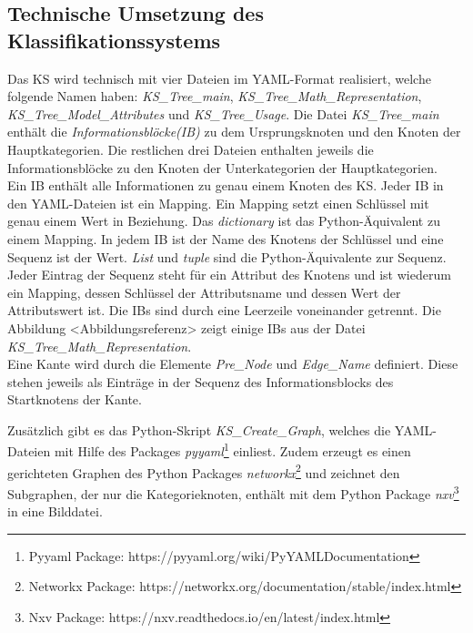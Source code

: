 \subsection{Technische Umsetzung des Klassifikationssystems}
\label{Ch:Ergebnisse:Sec:KS:SubSec:TechUmsetzung}
Das KS wird technisch mit vier Dateien im YAML-Format realisiert, welche folgende Namen haben: \textit{KS\_Tree\_main}, \textit{KS\_Tree\_Math\_Representation}, \textit{KS\_Tree\_Model\_Attributes} und \textit{KS\_Tree\_Usage}. Die Datei \textit{KS\_Tree\_main} enthält die \textit{Informationsblöcke(IB)} zu dem Ursprungsknoten und den Knoten der Hauptkategorien. Die restlichen drei Dateien enthalten jeweils die Informationsblöcke zu den Knoten der Unterkategorien der Hauptkategorien. \\ 
Ein IB enthält alle Informationen zu genau einem Knoten des KS. Jeder IB in den YAML-Dateien ist ein Mapping. Ein Mapping setzt einen Schlüssel mit genau einem Wert in Beziehung. Das \textit{dictionary} ist das Python-Äquivalent zu einem Mapping. In jedem IB ist der Name des Knotens der Schlüssel und eine Sequenz ist der Wert. \textit{List} und \textit{tuple} sind die Python-Äquivalente zur Sequenz. Jeder Eintrag der Sequenz steht für ein Attribut des Knotens und ist wiederum ein Mapping, dessen Schlüssel der Attributsname und dessen Wert der Attributswert ist. Die IB\grq s sind durch eine Leerzeile voneinander getrennt. Die Abbildung <Abbildungsreferenz> zeigt einige IB\grq s aus der Datei \textit{KS\_Tree\_Math\_Representation}.\\ %
Eine Kante wird durch die Elemente \textit{Pre\_Node} und \textit{Edge\_Name} definiert. Diese stehen jeweils als Einträge in der Sequenz des Informationsblocks des Startknotens der Kante.

Zusätzlich gibt es das Python-Skript \textit{KS\_Create\_Graph}, welches die YAML-Dateien mit Hilfe des Packages \textit{pyyaml}\footnote{Pyyaml Package: https://pyyaml.org/wiki/PyYAMLDocumentation} einliest. Zudem erzeugt es einen gerichteten Graphen des Python Packages \textit{networkx}\footnote{Networkx Package: https://networkx.org/documentation/stable/index.html} und zeichnet den Subgraphen, der nur die Kategorieknoten, enthält mit dem Python Package \textit{nxv}\footnote{Nxv Package: https://nxv.readthedocs.io/en/latest/index.html} in eine Bilddatei.

